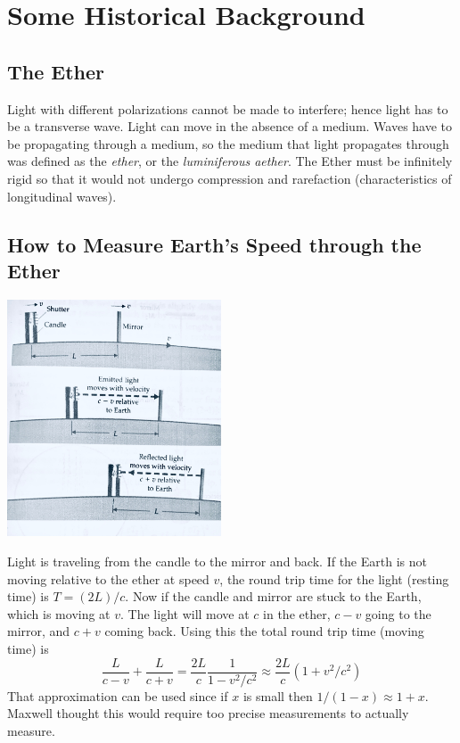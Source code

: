\section{Some Historical Background}
    \subsection*{The Ether}
        \indent
        Light with different polarizations cannot be made to interfere; hence light has to be a transverse wave. Light can move in the absence of a medium. Waves have to be propagating through a medium, so the medium that light propagates through was defined as the \textit{ether}, or the \textit{luminiferous aether}. 
        \newline \indent
        The Ether must be infinitely rigid so that it would not undergo compression and rarefaction (characteristics of longitudinal waves).
    \subsection*{How to Measure Earth's Speed through the Ether}
        \begin{center}
            \includegraphics[width=180pt]{candleMirror.jpg}
        \end{center}
        Light is traveling from the candle to the mirror and back. If the Earth is not moving relative to the ether at speed $v$, the round trip time for the light (resting time) is $T = (2L) / c$. Now if the candle and mirror are stuck to the Earth, which is moving at $v$. The light will move at $c$ in the ether, $c - v$ going to the mirror, and $c + v$ coming back. Using this the total round trip time (moving time) is
        \begin{equation*}
            \frac{L}{c-v} + \frac{L}{c+v} = \frac{2L}{c}\frac{1}{1 - v^2/c^2} \approx \frac{2L}{c}(1 + v^2/c^2)
        \end{equation*}
        That approximation can be used since if $x$ is small then $1/(1 - x) \approx 1 + x$. Maxwell thought this would require too precise measurements to actually measure.
